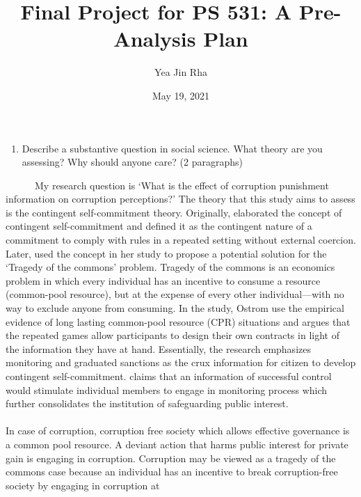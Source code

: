 \documentclass[
  11pt,
]{article}
\title{Final Project for PS 531: A Pre-Analysis Plan}
\author{Yea Jin Rha}
\date{May 19, 2021}
\providecommand{\tightlist}{%
  \setlength{\itemsep}{0pt}\setlength{\parskip}{0pt}}
\begin{document}
\maketitle

\begin{enumerate}
\def\labelenumi{\arabic{enumi}.}
\tightlist
\item
  Describe a substantive question in social science. What theory are you
  assessing? Why should anyone care? (2 paragraphs)
\end{enumerate}

~~~~~~My research question is `What is the effect of corruption
punishment information on corruption perceptions?' The theory that this
study aims to assess is the contingent self-commitment theory.
Originally,\textcite{levi_rule_1989} elaborated the concept of
contingent self-commitment and defined it as the contingent nature of a
commitment to comply with rules in a repeated setting without external
coercion. Later, \textcite{ostrom_governing_1990} used the concept in
her study to propose a potential solution for the `Tragedy of the
commons' problem. Tragedy of the commons is an economics problem in
which every individual has an incentive to consume a resource
(common-pool resource), but at the expense of every other
individual---with no way to exclude anyone from consuming. In the study,
Ostrom use the empirical evidence of long lasting common-pool resource
(CPR) situations and argues that the repeated games allow participants
to design their own contracts in light of the information they have at
hand. Essentially, the research emphasizes monitoring and graduated
sanctions as the crux information for citizen to develop contingent
self-commitment. \textcite{ostrom_governing_1990} claims that an
information of successful control would stimulate individual members to
engage in monitoring process which further consolidates the institution
of safeguarding public interest.\\
~\\
\hspace*{0.333em}\hspace*{0.333em}\hspace*{0.333em}\hspace*{0.333em}In
case of corruption, corruption free society which allows effective
governance is a common pool resource. A deviant action that harms public
interest for private gain is engaging in corruption. Corruption may be
viewed as a tragedy of the commons case because an individual has an
incentive to break corruption-free society by engaging in corruption at
\end{document}
